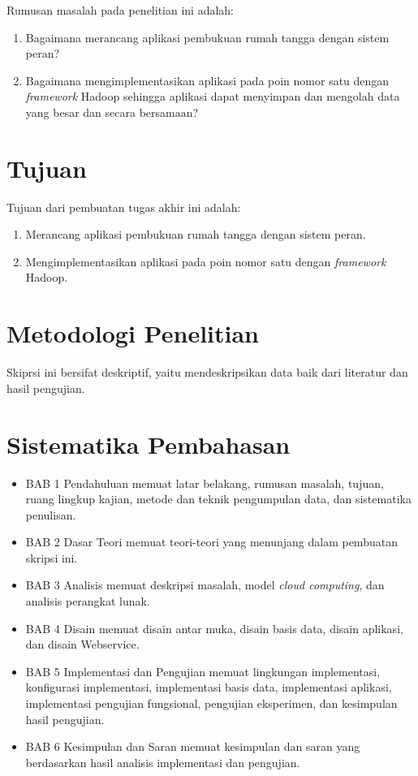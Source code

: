 Rumusan masalah pada penelitian ini adalah:
\begin{enumerate}
\item Bagaimana merancang aplikasi pembukuan rumah tangga dengan sistem peran?
\item Bagaimana mengimplementasikan aplikasi pada poin nomor satu dengan \textit{framework} Hadoop sehingga aplikasi dapat menyimpan dan mengolah data yang besar dan secara bersamaan?
\end{enumerate}

\section{Tujuan}
\label{sec:tujuan}

Tujuan dari pembuatan tugas akhir ini adalah:
\begin{enumerate}
\item Merancang aplikasi pembukuan rumah tangga dengan sistem peran.
\item Mengimplementasikan aplikasi pada poin nomor satu dengan \textit{framework} Hadoop.
\end{enumerate}

\section{Metodologi Penelitian}
\label{sec:metodologipenelitian}

Skiprsi ini bersifat deskriptif, yaitu mendeskripsikan data baik dari literatur dan hasil pengujian.

\section{Sistematika Pembahasan}
\label{sec:sistematikapembahasan}

\begin{itemize}
	\item BAB 1 Pendahuluan memuat latar belakang, rumusan masalah, tujuan, ruang lingkup kajian, metode dan teknik pengumpulan data, dan sistematika penulisan.
	\item BAB 2 Dasar Teori memuat teori-teori yang menunjang dalam pembuatan skripsi ini.
	\item BAB 3 Analisis memuat deskripsi masalah, model \textit{cloud computing}, dan analisis perangkat lunak.
	\item BAB 4 Disain memuat disain antar muka, disain basis data, disain aplikasi, dan disain Webservice.
	\item BAB 5 Implementasi dan Pengujian memuat lingkungan implementasi, konfigurasi implementasi, implementasi basis data, implementasi aplikasi, implementasi pengujian fungsional, pengujian eksperimen, dan kesimpulan hasil pengujian.
	\item BAB 6 Kesimpulan dan Saran memuat kesimpulan dan saran yang berdasarkan hasil analisis implementasi dan pengujian.
\end{itemize}
